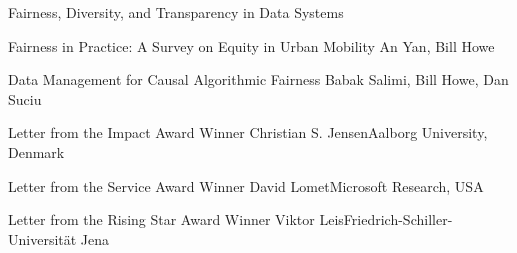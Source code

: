\documentclass[11pt]{article}
\begin{document}
\begin{bulletin}
\begin{articlesection}{Fairness, Diversity, and Transparency in Data Systems}
%
%
%

\begin{article}
{Fairness in Practice: A Survey on Equity in Urban Mobility}
{An Yan, Bill Howe}
\graphicspath{{submissions/Howe/}}

\end{article}



\begin{article}
{Data Management for Causal Algorithmic Fairness}
{Babak Salimi, Bill Howe, Dan Suciu}
\graphicspath{{submissions/Salimi/salimi/}}

\end{article}

\end{articlesection}




%
%



\begin{awardsection}
\begin{award}{Letter from the Impact Award Winner}
{Christian S. Jensen}{Aalborg University, Denmark}

\end{award}
\newpage
\begin{award}{Letter from the Service Award Winner}
{David Lomet}{Microsoft Research, USA}

\end{award}
\newpage
\begin{award}{Letter from the Rising Star Award Winner}
{Viktor Leis}{Friedrich-Schiller-Universität Jena}

\end{award}
\end{awardsection}




\end{bulletin}
\end{document}
